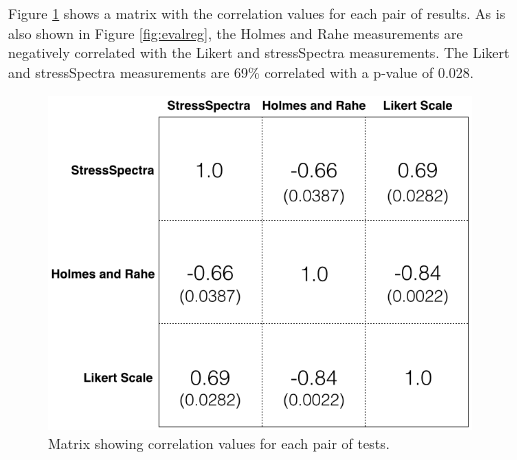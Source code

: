 \documentclass{sigchi}
\begin{document}
Figure \ref{fig:correlation} shows a matrix with the correlation values for each pair of results. As is also shown in Figure \ref{fig:evalreg}, the Holmes and Rahe measurements are negatively correlated with the Likert and stressSpectra measurements. The Likert and stressSpectra measurements are 69\% correlated with a p-value of 0.028.

\begin{figure}[h!]
\centering
\includegraphics[width=0.9\columnwidth]{correlation}
\caption{Matrix showing correlation values for each pair of tests.}
\label{fig:correlation}
\end{figure}
\end{document}
